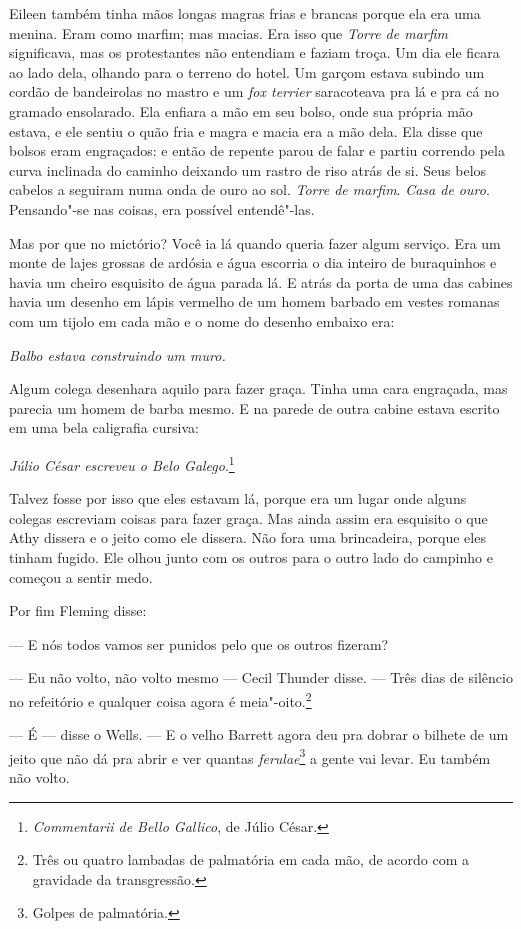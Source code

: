 Eileen também tinha mãos longas magras frias e brancas porque ela era
uma menina. Eram como marfim; mas macias. Era isso que \textit{Torre de
marfim} significava, mas os protestantes não entendiam e faziam troça.
Um dia ele ficara ao lado dela, olhando para o terreno do hotel. Um
garçom estava subindo um cordão de bandeirolas no mastro e um
\textit{fox terrier} saracoteava pra lá e pra cá no gramado ensolarado.
Ela enfiara a mão em seu bolso, onde sua própria mão estava, e ele
sentiu o quão fria e magra e macia era a mão dela. Ela disse que bolsos
eram engraçados: e então de repente parou de falar e partiu correndo
pela curva inclinada do caminho deixando um rastro de riso atrás de
si. Seus belos cabelos a seguiram numa onda de ouro ao sol.
\textit{Torre de marfim}. \textit{Casa de ouro}. Pensando"-se nas
coisas, era possível entendê"-las.

Mas por que no mictório? Você ia lá quando queria fazer algum serviço.
Era um monte de lajes grossas de ardósia e água escorria o dia inteiro
de buraquinhos e havia um cheiro esquisito de água parada lá. E atrás
da porta de uma das cabines havia um desenho em lápis vermelho de um
homem barbado em vestes romanas com um tijolo em cada mão e o nome do
desenho embaixo era:

\textit{Balbo estava construindo um muro.}

Algum colega desenhara aquilo para fazer graça. Tinha uma cara engraçada,
mas parecia um homem de barba mesmo. E na parede de outra cabine estava
escrito em uma bela caligrafia cursiva:

\textit{Júlio César escreveu o Belo Galego}.\footnote{
\textit{Commentarii de Bello Gallico}, de Júlio César.}

Talvez fosse por isso que eles estavam lá, porque era um lugar onde
alguns colegas escreviam coisas para fazer graça. Mas ainda assim era
esquisito o que Athy dissera e o jeito como ele dissera. Não fora uma
brincadeira, porque eles tinham fugido. Ele olhou junto com os outros
para o outro lado do campinho e começou a sentir medo.

Por fim Fleming disse:

 --- E nós todos vamos ser punidos pelo que os outros fizeram?

 --- Eu não volto, não volto mesmo --- Cecil Thunder disse. --- 
Três dias de silêncio no refeitório e qualquer coisa agora é meia"-oito.\footnote{ Três ou quatro lambadas de palmatória em cada mão, de acordo com a gravidade da transgressão.}

 --- É --- disse o Wells. --- E o velho Barrett agora deu pra dobrar o bilhete de
um jeito que não dá pra abrir e ver quantas \textit{ferulae}\footnote{ Golpes de palmatória.} 
a gente vai levar. Eu também não volto.

